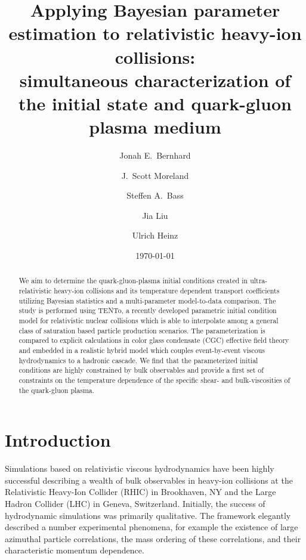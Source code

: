 \documentclass[aps,prc,reprint,amsmath,nofootinbib]{revtex4-1}
\newcommand{\trento}{T\raisebox{-0.5ex}{R}ENTo}
\begin{document}
\title{
  Applying Bayesian parameter estimation to relativistic heavy-ion collisions: \\
  simultaneous characterization of the initial state and quark-gluon plasma medium
}

\author{Jonah E.\ Bernhard}
\author{J.\ Scott Moreland}
\author{Steffen A.\ Bass}

\author{Jia Liu}
\author{Ulrich Heinz}

\date{\today}

\begin{abstract}
We aim to determine the quark-gluon-plasma initial conditions created in ultra-relativistic heavy-ion collisions and its temperature dependent transport coefficients utilizing Bayesian statistics and a multi-parameter model-to-data comparison.
The study is performed using \trento, a recently developed parametric initial condition model for relativistic nuclear collisions which is able to interpolate among a general class of saturation based particle production scenarios.
The parameterization is compared to explicit calculations in color glass condensate (CGC) effective field theory and embedded in a realistic hybrid model which couples event-by-event viscous hydrodynamics to a hadronic cascade.
We find that the parameterized initial conditions are highly constrained by bulk observables and provide a first set of constraints on the temperature dependence of the specific shear- and bulk-viscosities of the quark-gluon plasma.
\end{abstract}

\maketitle


\section{Introduction}

Simulations based on relativistic viscous hydrodynamics have been highly successful describing a wealth of bulk observables in heavy-ion collisions at the Relativistic Heavy-Ion Collider (RHIC) in Brookhaven, NY and the Large Hadron Collider (LHC) in Geneva, Switzerland.
Initially, the success of hydrodynamic simulations was primarily qualitative.
The framework elegantly described a number experimental phenomena, for example the existence of large azimuthal particle correlations, the mass ordering of these correlations, and their characteristic momentum dependence.
\end{document}
